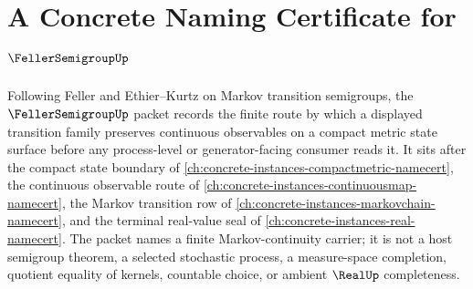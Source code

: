 \chapter{A Concrete Naming Certificate for $\FellerSemigroupUp$}
\label{ch:concrete-instances-feller-semigroup-namecert}

Following Feller and Ethier--Kurtz on Markov transition semigroups, the $\FellerSemigroupUp$ packet records the finite route by which a displayed transition family preserves continuous observables on a compact metric state surface before any process-level or generator-facing consumer reads it. It sits after the compact state boundary of \autoref{ch:concrete-instances-compactmetric-namecert}, the continuous observable route of \autoref{ch:concrete-instances-continuousmap-namecert}, the Markov transition row of \autoref{ch:concrete-instances-markovchain-namecert}, and the terminal real-value seal of \autoref{ch:concrete-instances-real-namecert}. The packet names a finite Markov-continuity carrier; it is not a host semigroup theorem, a selected stochastic process, a measure-space completion, quotient equality of kernels, countable choice, or ambient $\RealUp$ completeness.

